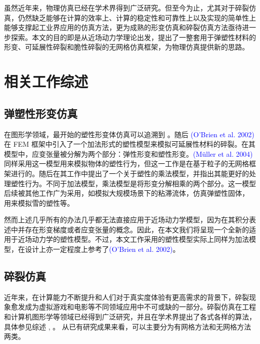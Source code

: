虽然近年来，物理仿真已经在学术界得到广泛研究。但至今为止，尤其对于碎裂仿真，仍然缺乏能够在计算的效率上、计算的稳定性和可靠性上以及实现的简单性上能够支撑起工业界应用的仿真方法，更为成熟的形变仿真和碎裂仿真方法亟待进一步探索。本文的目的即是从近场动力学理论出发，提出了一整套用于弹塑性材料的形变、可延展性碎裂和脆性碎裂的无网格仿真框架，为物理仿真提供新的思路。

\section{相关工作综述}
\label{related_work}

\subsection{弹塑性形变仿真}

在图形学领域，最开始的塑性形变体仿真可以追溯到 。随后 \textcolor{blue}{(O'Brien et al. 2002)\parencite{OBrien2002}} 在 FEM 框架中引入了一个加法形式的塑性模型来模拟可延展性材料的碎裂。在其模型中，应变张量被分解为两个部分：弹性形变和塑性形变。\textcolor{blue}{(M\"{u}ller et al. 2004)\parencite{Muller2004}} 同样采用这一模型用来模拟物体的塑性行为，但这一工作是在基于粒子的无网格框架进行的。随后在其工作中提出了一个关于塑性的乘法模型，并指出其能更好的处理塑性行为。不同于加法模型，乘法模型是将形变分解相乘的两个部分。这一模型后续被其他工作广为采用，如模拟大规模场景下的粘滞流体，仿真弹塑性固体， 用来模拟雪的塑性等。

然而上述几乎所有的办法几乎都无法直接应用于近场动力学模型，因为在其积分表述中并存在形变梯度或者应变张量的概念。因此，在本文我们将呈现一个全新的适用于近场动力学的塑性模型。不过，本文工作采用的塑性模型实际上同样为加法模型，在设计上亦一定程度上参考了\textcolor{blue}{(O'Brien et al. 2002)\parencite{OBrien2002}}。


\subsection{碎裂仿真}

近年来，在计算能力不断提升和人们对于真实度体验有更高需求的背景下，碎裂现象愈发成为虚拟游戏和电影等不同领域应用中不可或缺的一部分。碎裂仿真在工程和计算机图形学等领域已经得到广泛研究，并且在学术界提出了各式各样的算法，具体参见综述 , 。 从已有研究成果来看，可以主要分为有网格方法和无网格方法两类。

